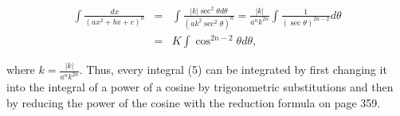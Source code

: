 \begin{eqnarray*} 
\int  \frac{dx}{(ax^2 + bx + c)^n} &=& \int \frac{|k| \sec^{2} \theta d\theta}{(ak^{2}\sec^{2} \theta)^n}
= \frac{|k|}{a^{n} k^{2n}} \int \frac{1}{(\sec \theta)^{2n -2}} d\theta\\
&=& K \int \cos^{2n-2} \theta d\theta , 
\end{eqnarray*}

\noindent where $k = \frac{|k|}{a^{n} k^{2n}}$. Thus, every integral (5) can be integrated by first changing it into the integral of a power of a cosine by trigonometric substitutions and then by reducing the power of the cosine with the reduction formula on page 359.

